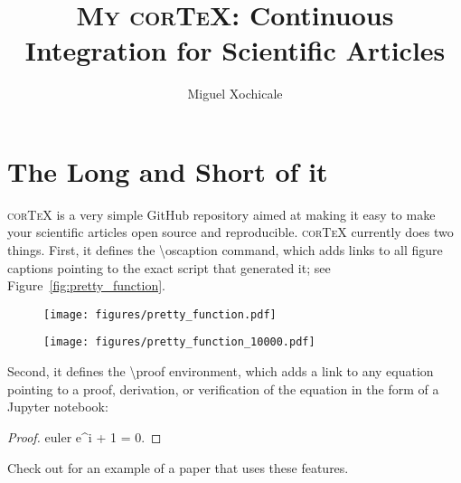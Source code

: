 \documentclass[modern]{aastex62}
\begin{document}
\title{\textsc{My corTeX}: Continuous Integration for Scientific Articles}

\author[0000-0002-8225-7517]{Miguel Xochicale}


\section{The Long and Short of it}
\label{sec:intro}
%
\textsc{corTeX} is a very simple \textsf{GitHub} repository aimed at making
it easy to make your scientific articles open source and reproducible.
\textsc{corTeX} currently does two things. First, it defines the
\textsf{\textbackslash oscaption} command, which adds
links to all figure captions pointing to the exact script that generated it;
see Figure~\ref{fig:pretty_function}.
%
\begin{figure}[h!]
    \begin{centering}
    \texttt{[image: figures/pretty\_function.pdf]}
    \end{centering}
\end{figure}
%

\begin{figure}[h!]
    \begin{centering}
    \texttt{[image: figures/pretty\_function\_10000.pdf]}
    \end{centering}
\end{figure}


Second, it defines the \textsf{\textbackslash proof} environment, which
adds a link to any equation pointing to a proof, derivation, or
verification of the equation in the form of a \textsf{Jupyter} notebook:
%
\begin{proof}{euler}
    \label{eq:euler}
    e^{i\pi} + 1 = 0.
\end{proof}
%
Check out \citet{Luger2018} for an example of a paper that uses these
features.

\pagebreak

\end{document}
